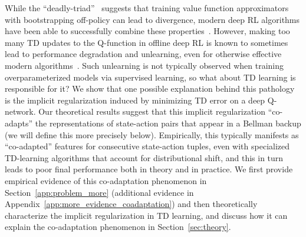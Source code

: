 \label{sec:problem}
While the ``deadly-triad''~\citep{suttonrlbook} suggests that training value function approximators with bootstrapping off-policy can lead to divergence, modern deep RL algorithms have been able to successfully combine these properties~\citep{Hasselt2018DeepRL}. However, making too many TD updates to the Q-function in offline deep RL is known to sometimes lead to performance degradation and unlearning, even for otherwise effective modern algorithms~\citep{fu2019diagnosing, fedus2020revisiting,agarwal2019optimistic,kumar2021implicit}. Such unlearning is not typically observed when training overparameterized models via supervised learning, so what about TD learning is responsible for it? We show that one possible explanation behind this pathology is the implicit regularization induced by minimizing TD error on a deep Q-network. Our theoretical results suggest that this implicit regularization ``co-adapts'' the representations of state-action pairs that appear in a Bellman backup (we will define this more precisely below).
Empirically, this typically manifests as ``co-adapted'' features for consecutive state-action tuples, even with specialized TD-learning algorithms that account for distributional shift, and this in turn leads to poor final performance both in theory and in practice. We first provide empirical evidence of this co-adaptation phenomenon in Section~\ref{app:problem_more} (additional evidence in Appendix~\ref{app:more_evidence_coadaptation}) and then theoretically characterize the implicit regularization in TD learning, and discuss how it can explain the co-adaptation phenomenon in Section~\ref{sec:theory}.


